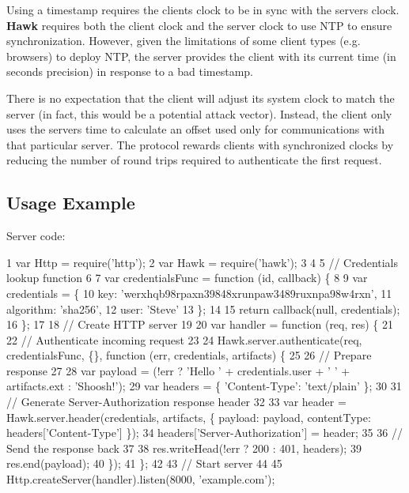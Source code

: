 Using a timestamp requires the client\textquotesingle{}s clock to be in sync with the server\textquotesingle{}s clock. {\bfseries Hawk} requires both the client clock and the server clock to use N\+T\+P to ensure synchronization. However, given the limitations of some client types (e.\+g. browsers) to deploy N\+T\+P, the server provides the client with its current time (in seconds precision) in response to a bad timestamp.

There is no expectation that the client will adjust its system clock to match the server (in fact, this would be a potential attack vector). Instead, the client only uses the server\textquotesingle{}s time to calculate an offset used only for communications with that particular server. The protocol rewards clients with synchronized clocks by reducing the number of round trips required to authenticate the first request.

\subsection*{Usage Example}

Server code\+:


\begin{DoxyCode}
1 var Http = require('http');
2 var Hawk = require('hawk');
3 
4 
5 // Credentials lookup function
6 
7 var credentialsFunc = function (id, callback) \{
8 
9     var credentials = \{
10         key: 'werxhqb98rpaxn39848xrunpaw3489ruxnpa98w4rxn',
11         algorithm: 'sha256',
12         user: 'Steve'
13     \};
14 
15     return callback(null, credentials);
16 \};
17 
18 // Create HTTP server
19 
20 var handler = function (req, res) \{
21 
22     // Authenticate incoming request
23 
24     Hawk.server.authenticate(req, credentialsFunc, \{\}, function (err, credentials, artifacts) \{
25 
26         // Prepare response
27 
28         var payload = (!err ? 'Hello ' + credentials.user + ' ' + artifacts.ext : 'Shoosh!');
29         var headers = \{ 'Content-Type': 'text/plain' \};
30 
31         // Generate Server-Authorization response header
32 
33         var header = Hawk.server.header(credentials, artifacts, \{ payload: payload, contentType:
       headers['Content-Type'] \});
34         headers['Server-Authorization'] = header;
35 
36         // Send the response back
37 
38         res.writeHead(!err ? 200 : 401, headers);
39         res.end(payload);
40     \});
41 \};
42 
43 // Start server
44 
45 Http.createServer(handler).listen(8000, 'example.com');
\end{DoxyCode}


